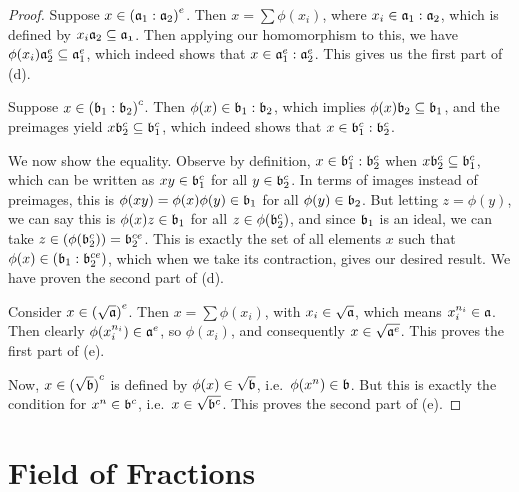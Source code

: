 \begin{proof}
    \medskip

    Suppose \(x \in {(\mathfrak{a}_1:\mathfrak{a}_2)}^e\).
    Then \(x = \sum \phi(x_i)\), where \(x_i \in \mathfrak{a}_1:\mathfrak{a}_2\),
    which is defined by \(x_i\mathfrak{a}_2 \subseteq \mathfrak{a_1}\).
    Then applying our homomorphism to this, we have \(\phi(x_i)\mathfrak{a}_2^e \subseteq \mathfrak{a}_1^e\),
    which indeed shows that \(x \in \mathfrak{a}_1^e:\mathfrak{a}_2^e\).
    This gives us the first part of (d).

    Suppose \(x \in {(\mathfrak{b}_1:\mathfrak{b}_2)}^c\).
    Then \(\phi(x) \in \mathfrak{b}_1:\mathfrak{b}_2\),
    which implies \(\phi(x)\mathfrak{b}_2 \subseteq \mathfrak{b}_1\),
    and the preimages yield \(x\mathfrak{b}_2^c \subseteq \mathfrak{b}_1^c\),
    which indeed shows that \(x \in \mathfrak{b}_1^c:\mathfrak{b}_2^c\).

    We now show the equality.
    Observe by definition, \(x \in \mathfrak{b}_1^c:\mathfrak{b}_2^c\)
    when \(x\mathfrak{b}_2^c \subseteq \mathfrak{b}_1^c\),
    which can be written as \(xy \in \mathfrak{b}_1^c\) for all \(y \in \mathfrak{b}_2^c\).
    In terms of images instead of preimages,
    this is \(\phi(xy) = \phi(x)\phi(y) \in \mathfrak{b}_1\) for all \(\phi(y) \in \mathfrak{b}_2\).
    But letting \(z = \phi(y)\),
    we can say this is \(\phi(x)z \in \mathfrak{b}_1\) for all \(z \in \phi(\mathfrak{b}_2^c)\),
    and since \(\mathfrak{b}_1\) is an ideal, we can take \(z \in (\phi(\mathfrak{b}_2^c)) = \mathfrak{b}_2^{ce}\).
    This is exactly the set of all elements \(x\)
    such that \(\phi(x) \in {(\mathfrak{b}_1:\mathfrak{b}_2^{ce})}\),
    which when we take its contraction, gives our desired result.
    We have proven the second part of (d).

    \medskip

    Consider \(x \in {(\sqrt{\mathfrak{a}})}^e\).
    Then \(x = \sum \phi(x_i)\), with \(x_i \in \sqrt{\mathfrak{a}}\),
    which means \(x_i^{n_i} \in \mathfrak{a}\).
    Then clearly \(\phi(x_i^{n_i}) \in \mathfrak{a}^e\),
    so \(\phi(x_i)\), and consequently \(x \in \sqrt{\mathfrak{a}^e}\).
    This proves the first part of (e).

    Now, \(x \in {(\sqrt{\mathfrak{b}})}^c\)
    is defined by \(\phi(x) \in \sqrt{\mathfrak{b}}\),
    i.e.\ \(\phi(x^n) \in \mathfrak{b}\).
    But this is exactly the condition for \(x^n \in \mathfrak{b}^c\),
    i.e.\ \(x \in \sqrt{\mathfrak{b}^c}\).
    This proves the second part of (e).
\end{proof}


\section{Field of Fractions}

